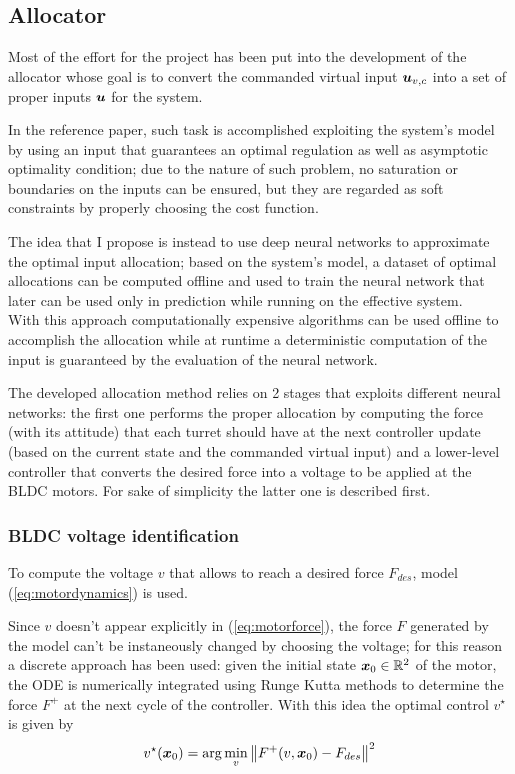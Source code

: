 \subsection{Allocator}
Most of the effort for the project has been put into the development of the allocator whose goal is to convert the commanded virtual input $\boldsymbol{u}_{v,c}$ into a set of proper inputs $\boldsymbol{u}$ for the system.

In the reference paper, such task is accomplished exploiting the system's model by using an input that guarantees an optimal regulation as well as asymptotic optimality condition; due to the nature of such problem, no saturation or boundaries on the inputs can be ensured, but they are regarded as soft constraints by properly choosing the cost function.

The idea that I propose is instead to use deep neural networks to approximate the optimal input allocation; based on the system's model, a dataset of optimal allocations can be computed offline and used to train the neural network that later can be used only in prediction while running on the effective system. \\
With this approach computationally expensive algorithms can be used offline to accomplish the allocation while at runtime a deterministic computation of the input is guaranteed by the evaluation of the neural network.

The developed allocation method relies on 2 stages that exploits different neural networks: the first one performs the proper allocation by computing the force (with its attitude) that each turret should have at the next controller update (based on the current state and the commanded virtual input) and a lower-level controller that converts the desired force into a voltage to be applied at the BLDC motors. For sake of simplicity the latter one is described first. \vspace{3mm}

\subsubsection{BLDC voltage identification}
To compute the voltage $v$ that allows to reach a desired force $F_{des}$, model (\ref{eq:motordynamics}) is used.

Since $v$ doesn't appear explicitly in (\ref{eq:motorforce}), the force $F$ generated by the model can't be instaneously changed by choosing the voltage; for this reason a discrete approach has been used: given the initial state $\boldsymbol{x}_{0} \in \mathbb R^{2}$ of the motor, the ODE is numerically integrated using Runge Kutta methods to determine the force $F^{+}$ at the next cycle of the controller. With this idea the optimal control $v^{\star}$ is given by
\begin{equation} \label{eq:optimalvoltage}
    v^{\star}(\vett x_{0}) = \arg \min_{v} \big\|F^{+}(v, \vett x_{0}) - F_{des}\big\|^{2}
\end{equation}


